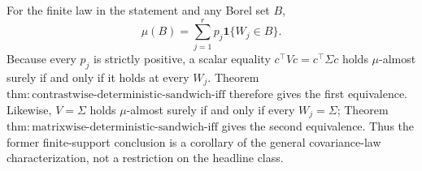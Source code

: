 For the finite law in the statement and any Borel set \(B\),
\[
 \mu(B)=\sum_{j=1}^rp_j\mathbf1\{W_j\in B\}. \tag{1}
\]
Because every \(p_j\) is strictly positive, a scalar equality \(c^\top Vc=c^\top\Sigma c\) holds \(\mu\)-almost surely if and only if it holds at every \(W_j\). Theorem \(\mathrm{thm:contrastwise\text{-}deterministic\text{-}sandwich\text{-}iff}\) therefore gives the first equivalence. Likewise, \(V=\Sigma\) holds \(\mu\)-almost surely if and only if every \(W_j=\Sigma\); Theorem \(\mathrm{thm:matrixwise\text{-}deterministic\text{-}sandwich\text{-}iff}\) gives the second equivalence. Thus the former finite-support conclusion is a corollary of the general covariance-law characterization, not a restriction on the headline class.